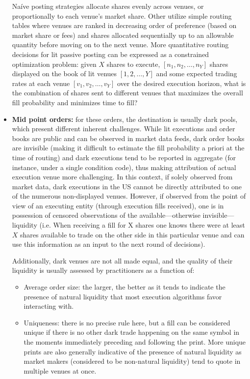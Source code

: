 \begin{itemize}
Na\'ive posting strategies allocate shares evenly across venues, or proportionally to each venue's market share. Other utilize simple routing tables where venues are ranked in decreasing order of preference (based on market share or fees) and shares allocated sequentially up to an allowable quantity before moving on to the next venue. More quantitative routing decisions for lit passive posting can be expressed as a constrained optimization problem: given $X$ shares to execute, $[n_1, n_2, \ldots, n_Y]$ shares displayed on the book of lit venues $[1, 2, \ldots, Y]$ and some expected trading rates at each venue $[v_1, v_2, \ldots, v_Y]$ over the desired execution horizon, what is the combination of shares sent to different venues that maximizes the overall fill probability and minimizes time to fill?


\item \textbf{Mid point orders:} for these orders, the destination is usually dark pools, which present different inherent challenges. While lit executions and order books are public and can be observed in market data feeds, dark order books are invisible (making it difficult to estimate the fill probability a priori at the time of routing) and dark executions tend to be reported in aggregate (for instance, under a single condition code), thus making attribution of actual execution venue more challenging. In this context, if solely observed from market data, dark executions in the US cannot be directly attributed to one of the numerous non-displayed venues. However, if observed from the point of view of an executing entity (through execution fills received), one is in possession of censored observations of the available---otherwise invisible---liquidity (i.e. When receiving a fill for X shares one knows there were at least $X$ shares available to trade on the other side in this particular venue and can use this information as an input to the next round of decisions). 


Additionally, dark venues are not all made equal, and the quality of their liquidity is usually assessed by practitioners as a function of: 

\begin{itemize}
\item Average order size: the larger, the better as it tends to indicate the presence of natural liquidity that most execution algorithms favor interacting with.

\item Uniqueness: there is no precise rule here, but a fill can be considered unique if there is no other dark trade happening on the same symbol in the moments immediately preceding and following the print. More unique prints are also generally indicative of the presence of natural liquidity as market makers (considered to be non-natural liquidity) tend to quote in multiple venues at once.


\end{itemize}
\end{itemize}
